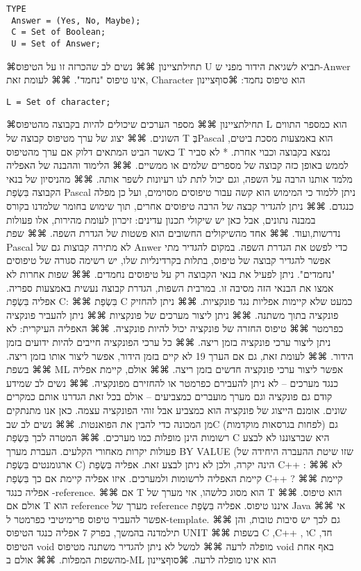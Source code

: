 \begin{verbatim}
TYPE
 Answer = (Yes, No, Maybe);
 C = Set of Boolean;
 U = Set of Answer;
\end{verbatim}
      ⌘תחילת{ציינון}
      ⌘⌘ נשים לב שהכרזה זו על הטיפוס U תביא לשגיאת הידור מפני ש-Anwer אינו טיפוס "נחמד".
      ⌘⌘ לעומת זאת, Character הוא טיפוס נחמד:
    ⌘סוף{ציינון}
\begin{verbatim}
L = Set of character;
\end{verbatim}
      ⌘תחילת{ציינון}
      ⌘⌘ מספר הערכים שיכולים להיות בקבוצה מהטיפוס L הוא כמספר התווים השונים.
      ⌘⌘ יצוג של ערך
      מטיפוס קבוצה של
      T בְּPascal הוא
      באמצעות מסכת
      ביטים, כאשר הביט
      המתאים דלוק אם
      ערך מהטיפוס T
      נמצא בקבוצה
      וכבוי אחרת. *
      לא סביר לממש
      באופן כזה קבוצה
      של מספרים שלמים
      או ממשיים.
      ⌘⌘ הלימוד וההבנה של האפליה מלמד אותנו הרבה על השפה, וגם יכול לתת לנו רעיונות לשפר אותה.
      ⌘⌘ מהניסיון של בנאי הקבוצה בִּשְׂפַת Pascal ניתן ללמוד כי המימוש הוא קשה עבור טיפוסים מסוימים, ועל כן מפלה כנגדם.
      ⌘⌘ ניתן להגדיר קבצה של הרבה טיפוסים אחרים, תוך שימוש בחומר שלמדנו בקורס במבנה נתונים, אבל כאן יש שיקולי תכנון עדינים: זיכרון לעומת מהירות, אלו פעולות נדרשות,ועוד.
      ⌘⌘ אחד מהשיקולים החשובים הוא פשטות של הגדרת השפה.
      ⌘⌘ שפת Pascal לא מתירה קבוצות גם של Anwer כדי לפשט את הגדרת השפה. במקום להגדיר מתי אפשר להגדיר קבוצה של טיפוס, בתלות בקרדינליות שלו, יש רשימה סגורה של טיפוסים "נחמדים". ניתן לפעיל את בנאי הקבוצה רק על טיפוסים נחמדים.
      ⌘⌘ שפות אחרות לא אמצו את הבנאי הזה מסיבה זו. במרבית השפות, הגדרת קבוצה נעשית באמצעות ספריה.
      אפליה בִּשְׂפַת C:
      ⌘⌘ בִּשְׂפַת C כמעט שלא קיימות אפליות נגד פונקציות.
      ⌘⌘ ניתן להחזיק פונקציה בתוך משתנה.
      ⌘⌘ ניתן ליצור מערכים של פונקציות
      ⌘⌘ ניתן להעביר פונקציה כפרמטר
      ⌘⌘ טיפוס החזרה של פונקציה יכול להיות פונקציה.
      ⌘⌘ האפליה העיקרית: לא ניתן ליצור ערכי פונקציה בזמן ריצה.
      ⌘⌘ כל ערכי הפונקציה חייבים להיות ידועים בזמן הידור.
      ⌘⌘ לעומת זאת, גם אם הערך 19 לא קיים בזמן הידור, אפשר ליצור אותו בזמן ריצה.
      ⌘⌘ בשפת ML אפשר ליצור ערכי פונקציה חדשים בזמן ריצה.
      ⌘⌘ אולם, קיימת אפליה כנגד מערכים – לא ניתן להעבירם כפרמטר או להחזירם מפונקציה.
      ⌘⌘ נשים לב שמידע קודם גם פונקציה וגם מערך מועברים כמצביעים – אולם בכל זאת הגדרנו אותם כמקרים שונים. אומנם הייצוג של פונקציה הוא כמצביע אבל זוהי הפונקציה עצמה. כאן אנו מתנתקים מן המכונה כדי להבין את הפואנטות.
      ⌘⌘ נשים לב שבC (לפחות בגרסאות מוקדמות) גם רשומות הינן מופלות כמו מערכים.
      ⌘⌘ המטרה לכך בִּשְׂפַת C היא שברצוננו לא לבצע פעולות יקרות מאחורי הקלעים. העברת מערך BY VALUE (שזו שיטת ההעברה היחידה של ארגומנטים בִּשְׂפַת C) הינה יקרה, ולכן לא ניתן לבצע זאת.
      אפליה בִּשְׂפַת C++ :
      ⌘⌘ לא קיימת האפליה לרשומות ולמערכים. איזו אפליה קיימת אם כך בִּשְׂפַת C++ ?
      ⌘⌘ קיימת אפליה כנגד -reference.
      ⌘⌘ אם T הוא מסוג כלשהו, אזי מערך של T הוא טיפוס.
      ⌘⌘ אולם אם T הוא reference מערך של reference איננו טיפוס.
      אפליה בִּשְׂפַת Java
      ⌘⌘ אי אפשר להעביר טיפוס פרימיטיבי כפרמטר ל-template.
      ⌘⌘ גם לכך יש סיבות טובות, והן תילמדנה בהמשך, בפרק 7
      אפליה כנגד הטיפוס UNIT
      ⌘⌘ בשפות C ,C++ , וC חד, הטיפוס void מופלה לרעה
      ⌘⌘ למשל לא ניתן להגדיר משתנה מטיפוס void באף אחת מהשפות המפלות.
      ⌘⌘ אולם ב-ML הוא אינו מופלה לרעה.
    ⌘סוף{ציינון}

